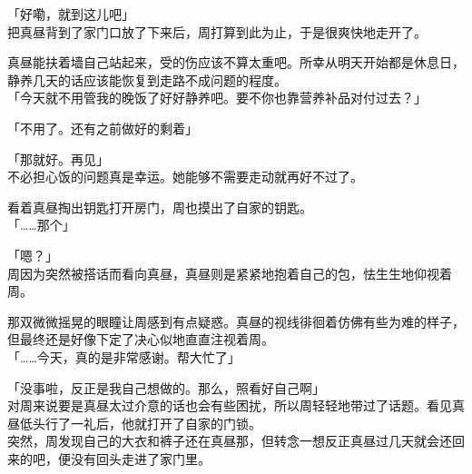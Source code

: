 「好嘞，就到这儿吧」\\

把真昼背到了家门口放了下来后，周打算到此为止，于是很爽快地走开了。

真昼能扶着墙自己站起来，受的伤应该不算太重吧。所幸从明天开始都是休息日，静养几天的话应该能恢复到走路不成问题的程度。\\

「今天就不用管我的晚饭了好好静养吧。要不你也靠营养补品对付过去？」

「不用了。还有之前做好的剩着」

「那就好。再见」\\

不必担心饭的问题真是幸运。她能够不需要走动就再好不过了。

看着真昼掏出钥匙打开房门，周也摸出了自家的钥匙。\\

「……那个」

「嗯？」\\

周因为突然被搭话而看向真昼，真昼则是紧紧地抱着自己的包，怯生生地仰视着周。

那双微微摇晃的眼瞳让周感到有点疑惑。真昼的视线徘徊着仿佛有些为难的样子，但最终还是好像下定了决心似地直直注视着周。\\

「……今天，真的是非常感谢。帮大忙了」

「没事啦，反正是我自己想做的。那么，照看好自己啊」\\

对周来说要是真昼太过介意的话也会有些困扰，所以周轻轻地带过了话题。看见真昼低头行了一礼后，他就打开了自家的门锁。\\

突然，周发现自己的大衣和裤子还在真昼那，但转念一想反正真昼过几天就会还回来的吧，便没有回头走进了家门里。
